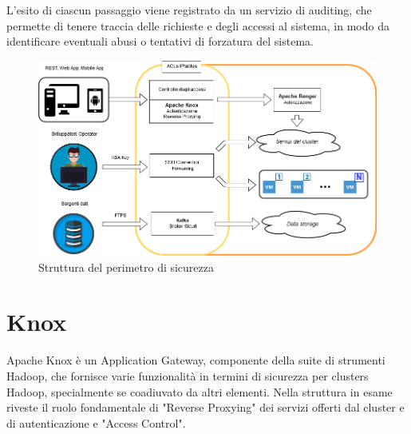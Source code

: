 L'esito di ciascun passaggio viene registrato da un servizio di auditing, che permette di tenere traccia delle richieste e degli accessi al sistema, in modo da identificare eventuali abusi o tentativi di forzatura del sistema.\\
\begin{figure}[h]
	\centering
	\includegraphics[scale=0.4]{Figures/security_diagram.png}
	\decoRule
	\caption[Struttura Sicurezza]{Struttura del perimetro di sicurezza}
	\label{fig:security_diagram}
\end{figure}
\pagebreak

\section{Knox}

Apache Knox \cite{knox_doc} è un Application Gateway, componente della suite di strumenti Hadoop, che fornisce varie funzionalità in termini di sicurezza per clusters Hadoop, specialmente se coadiuvato da altri elementi.
\newline
Nella struttura in esame riveste il ruolo fondamentale di "Reverse Proxying" dei servizi offerti dal cluster e di autenticazione e "Access Control".

